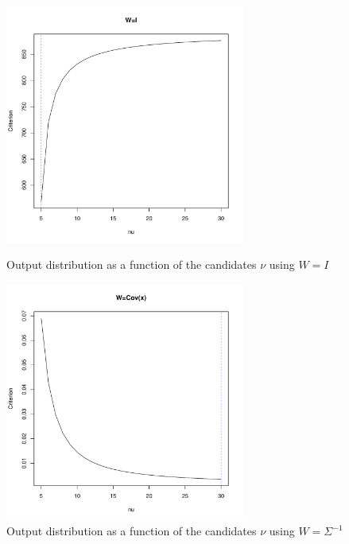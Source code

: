 \newpage

\begin{figure}\label{SP500_returns_criterion}
    \centering
    \includegraphics[width=0.7\textwidth]{S&P500_returns_criterion_(W=I).pdf}
    \caption{Output distribution as a function of the candidates $\nu$ using $W=I$}
    \includegraphics[width=0.7\textwidth]{S&P500_returns_criterion_(W=Sigma^-1).pdf}
    \caption{Output distribution as a function of the candidates $\nu$ using $W=\Sigma^{-1}$}
\end{figure}

